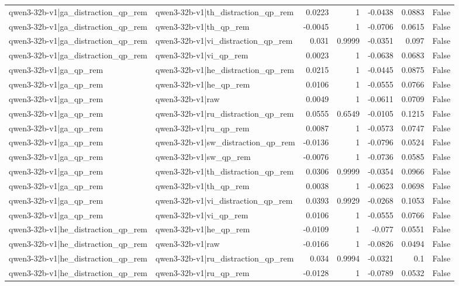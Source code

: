 \begin{table}
\begin{tabular}{l l r r r r l}
qwen3-32b-v1|ga_distraction_qp_rem & qwen3-32b-v1|th_distraction_qp_rem & 0.0223 & 1 & -0.0438 & 0.0883 & False \\
qwen3-32b-v1|ga_distraction_qp_rem & qwen3-32b-v1|th_qp_rem & -0.0045 & 1 & -0.0706 & 0.0615 & False \\
qwen3-32b-v1|ga_distraction_qp_rem & qwen3-32b-v1|vi_distraction_qp_rem & 0.031 & 0.9999 & -0.0351 & 0.097 & False \\
qwen3-32b-v1|ga_distraction_qp_rem & qwen3-32b-v1|vi_qp_rem & 0.0023 & 1 & -0.0638 & 0.0683 & False \\
qwen3-32b-v1|ga_qp_rem & qwen3-32b-v1|he_distraction_qp_rem & 0.0215 & 1 & -0.0445 & 0.0875 & False \\
qwen3-32b-v1|ga_qp_rem & qwen3-32b-v1|he_qp_rem & 0.0106 & 1 & -0.0555 & 0.0766 & False \\
qwen3-32b-v1|ga_qp_rem & qwen3-32b-v1|raw & 0.0049 & 1 & -0.0611 & 0.0709 & False \\
qwen3-32b-v1|ga_qp_rem & qwen3-32b-v1|ru_distraction_qp_rem & 0.0555 & 0.6549 & -0.0105 & 0.1215 & False \\
qwen3-32b-v1|ga_qp_rem & qwen3-32b-v1|ru_qp_rem & 0.0087 & 1 & -0.0573 & 0.0747 & False \\
qwen3-32b-v1|ga_qp_rem & qwen3-32b-v1|sw_distraction_qp_rem & -0.0136 & 1 & -0.0796 & 0.0524 & False \\
qwen3-32b-v1|ga_qp_rem & qwen3-32b-v1|sw_qp_rem & -0.0076 & 1 & -0.0736 & 0.0585 & False \\
qwen3-32b-v1|ga_qp_rem & qwen3-32b-v1|th_distraction_qp_rem & 0.0306 & 0.9999 & -0.0354 & 0.0966 & False \\
qwen3-32b-v1|ga_qp_rem & qwen3-32b-v1|th_qp_rem & 0.0038 & 1 & -0.0623 & 0.0698 & False \\
qwen3-32b-v1|ga_qp_rem & qwen3-32b-v1|vi_distraction_qp_rem & 0.0393 & 0.9929 & -0.0268 & 0.1053 & False \\
qwen3-32b-v1|ga_qp_rem & qwen3-32b-v1|vi_qp_rem & 0.0106 & 1 & -0.0555 & 0.0766 & False \\
qwen3-32b-v1|he_distraction_qp_rem & qwen3-32b-v1|he_qp_rem & -0.0109 & 1 & -0.077 & 0.0551 & False \\
qwen3-32b-v1|he_distraction_qp_rem & qwen3-32b-v1|raw & -0.0166 & 1 & -0.0826 & 0.0494 & False \\
qwen3-32b-v1|he_distraction_qp_rem & qwen3-32b-v1|ru_distraction_qp_rem & 0.034 & 0.9994 & -0.0321 & 0.1 & False \\
qwen3-32b-v1|he_distraction_qp_rem & qwen3-32b-v1|ru_qp_rem & -0.0128 & 1 & -0.0789 & 0.0532 & False \\

\end{tabular}
\end{table}
